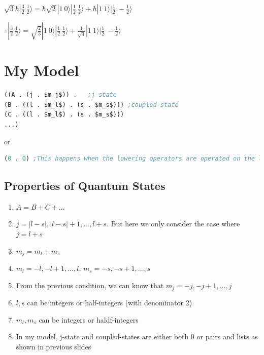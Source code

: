 \documentclass[
paper=128mm:96mm, %
fontsize=11pt, %
pagesize, %
parskip=half-, %
]{scrartcl} %
\theoremstyle{mythmstyle} %
\begin{document}
$\sqrt{3} \hbar |\frac{3}{2}\ \frac{1}{2}\rangle = \hbar \sqrt{2} |1\ 0\rangle |\frac{1}{2}\ \frac{1}{2}\rangle + \hbar |1\ 1\rangle |\frac{1}{2}\ -\frac{1}{2}\rangle$

$\therefore |\frac{3}{2}\ \frac{1}{2}\rangle = \sqrt{\frac{2}{3}} |1\ 0\rangle |\frac{1}{2}\ \frac{1}{2}\rangle + \frac{1}{\sqrt{3}} |1\ 1\rangle |\frac{1}{2}\ -\frac{1}{2}\rangle$


\clearpage

\section{My Model}

\begin{lstlisting}[language=Lisp,breaklines=true,mathescape]
((A . (j . $m_j$)) .   ;j-state
(B . ((l . $m_l$) . (s . $m_s$))) ;coupled-state
(C . ((l . $m_l$) . (s . $m_s$)))
...)
\end{lstlisting}

or

\begin{lstlisting}[language=Lisp,breaklines=true,mathescape]
(0 . 0) ;This happens when the lowering operators are operated on the lowest states
\end{lstlisting}

\clearpage


\subsection{Properties of Quantum States}

\begin{enumerate}

\item $A=B+C+ \ldots$

\item $j= |l-s|, |l-s|+1, ... ,l+s$. But here we only consider the case where $j=l+s$

\item $m_j=m_l+m_s$

\item $m_l= -l ,-l+1 ,..., l$, $m_s = -s,-s+1, ... ,s$

\item From the previous condition, we can know that $m_j= -j, -j+1 ,... ,j$

\item $l,s$ can be integers or half-integers (with denominator 2)

\item $m_l, m_s$ can be integers or haldf-integers

\item In my model, j-state and coupled-states are either both 0 or pairs and lists as shown in previous slides

\end{enumerate}
\clearpage
\end{document}
